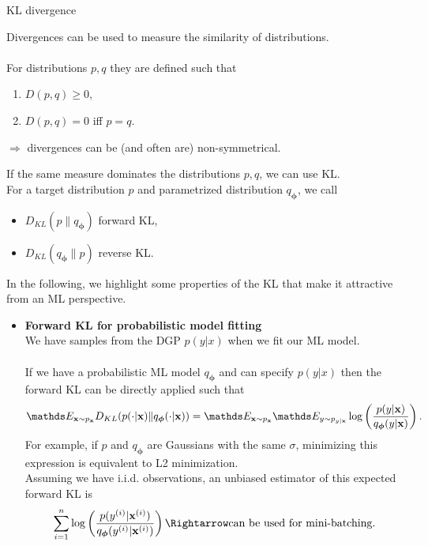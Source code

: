 \documentclass[11pt,compress,t,notes=noshow, xcolor=table]{beamer}
\begin{document}
\begin{vbframe}{KL divergence}

Divergences can be used to measure the similarity of distributions. \\ \lz \\For distributions $p, q$ they are defined such that
\begin{enumerate}
    \item $D(p, q) \geq 0,$
    \item $D(p, q) = 0$ iff $p = q.$
\end{enumerate}
$\Rightarrow$ divergences can be (and often are) non-symmetrical. \\
 \lz
 
If the same measure dominates the distributions $p,q$, we can use KL. \\
For a target distribution $p$ and parametrized distribution $q_{\bm{\phi}}$, we call
\begin{itemize}
    \item $D_{KL}(p \| q_{\bm{\phi}})$ forward KL,
    \item $D_{KL}(q_{\bm{\phi}} \| p)$ reverse KL.
\end{itemize}
\lz
In the following, we highlight some properties of the KL that make it attractive from an ML perspective.

\framebreak

\begin{itemize}
    \item \textbf{Forward KL for probabilistic model fitting}
    \\ We have samples from the DGP $p(y|x)$ when we fit our ML model.
    \\
    \lz
    \\
    If we have a probabilistic ML model $q_{\bm{\phi}}$ and can specify $p(y|x)$ then the forward KL can be directly applied such that
    $$\E_{\xv \sim p_{\xv}}D_{KL}(p(\cdot|\xv) \| q_{\bm{\phi}}(\cdot|\xv)) = \E_{\xv \sim p_{\xv}}\E_{y \sim p_{y|\xv}}\log\left(\frac{p(y|\xv)}{q_{\bm{\phi}}(y|\xv)}\right).$$
For example, if $p$ and $q_{\bm{\phi}}$ are Gaussians with the same $\sigma$, minimizing this expression is equivalent to L2 minimization. \\
\lz 
Assuming we have i.i.d. observations, an unbiased estimator of this expected forward KL is
$$\sumin \log\left(\frac{p(\yi|\xi)}{q_{\bm{\phi}}(\yi|\xi)}\right) \Rightarrow \text{can be used for mini-batching.} $$


\end{itemize}
\end{vbframe}
\end{document}

